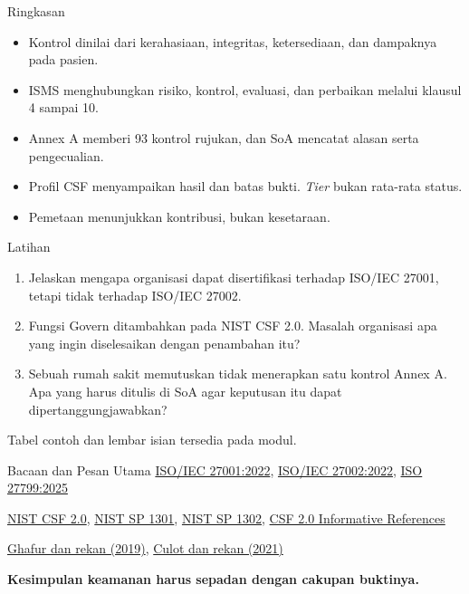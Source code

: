 \documentclass[aspectratio=169, table, 12pt]{beamer}
\begin{document}
\begin{frame}{{\Large Ringkasan}}
  \vspace{6pt}
  \small
  \begin{itemize}
    \item Kontrol dinilai dari kerahasiaan, integritas, ketersediaan, dan dampaknya pada pasien.
    \item ISMS menghubungkan risiko, kontrol, evaluasi, dan perbaikan melalui klausul 4 sampai 10.
    \item Annex A memberi 93 kontrol rujukan, dan SoA mencatat alasan serta pengecualian.
    \item Profil CSF menyampaikan hasil dan batas bukti. \textit{Tier} bukan rata-rata status.
    \item Pemetaan menunjukkan kontribusi, bukan kesetaraan.
  \end{itemize}
\end{frame}

\begin{frame}{{\Large Latihan}}
  \vspace{6pt}
  \small
  \begin{enumerate}
    \item Jelaskan mengapa organisasi dapat disertifikasi terhadap ISO/IEC 27001, tetapi tidak
          terhadap ISO/IEC 27002.
    \item Fungsi Govern ditambahkan pada NIST CSF 2.0. Masalah organisasi apa yang ingin diselesaikan
          dengan penambahan itu?
    \item Sebuah rumah sakit memutuskan tidak menerapkan satu kontrol Annex A. Apa yang harus ditulis
          di SoA agar keputusan itu dapat dipertanggungjawabkan?
  \end{enumerate}

  \vspace{6pt}
  Tabel contoh dan lembar isian tersedia pada modul.
\end{frame}

\begin{frame}{{\Large Bacaan dan Pesan Utama}}
  \vspace{6pt}
  \small
  \href{https://www.iso.org/standard/27001}{ISO/IEC 27001:2022},
  \href{https://www.iso.org/standard/75652.html}{ISO/IEC 27002:2022},
  \href{https://www.iso.org/standard/84647.html}{ISO 27799:2025}\par
  \href{https://doi.org/10.6028/NIST.CSWP.29}{NIST CSF 2.0},
  \href{https://doi.org/10.6028/NIST.SP.1301}{NIST SP 1301},
  \href{https://doi.org/10.6028/NIST.SP.1302}{NIST SP 1302},
  \href{https://www.nist.gov/informative-references}{CSF 2.0 Informative References}\par
  \href{https://pmc.ncbi.nlm.nih.gov/articles/PMC6775064/}{Ghafur dan rekan (2019)},
  \href{https://doi.org/10.1108/TQM-09-2020-0202}{Culot dan rekan (2021)}\par
  \vspace{14pt}
  \begin{center}
    \large\textbf{Kesimpulan keamanan harus sepadan dengan cakupan buktinya.}
  \end{center}
\end{frame}
\end{document}
